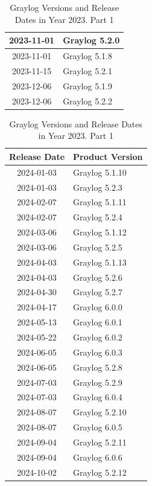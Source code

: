 \documentclass[../main.tex]{subfiles}
\begin{document}
\begin{table}[h]
\begin{minipage}{0.45\textwidth}
\begin{tabular}{|c|l|}
    2023-11-01 & Graylog 5.2.0 \\ \hline  
    2023-11-01 & Graylog 5.1.8 \\ \hline  
    2023-11-15 & Graylog 5.2.1 \\ \hline  
    2023-12-06 & Graylog 5.1.9 \\ \hline  
    2023-12-06 & Graylog 5.2.2 \\ \hline  
\end{tabular}
\caption{Graylog Versions and Release Dates in Year 2023. Part 1}
\end{minipage}
\hspace{1cm} %
\begin{minipage}{0.45\textwidth}
\centering
\begin{tabular}{|c|l|}
\hline
\textbf{Release Date} & \textbf{Product Version} \\ \hline
    2024-01-03 & Graylog 5.1.10 \\ \hline  
    2024-01-03 & Graylog 5.2.3 \\ \hline  
    2024-02-07 & Graylog 5.1.11 \\ \hline  
    2024-02-07 & Graylog 5.2.4 \\ \hline  
    2024-03-06 & Graylog 5.1.12 \\ \hline  
    2024-03-06 & Graylog 5.2.5 \\ \hline  
    2024-04-03 & Graylog 5.1.13 \\ \hline  
    2024-04-03 & Graylog 5.2.6 \\ \hline  
    2024-04-30 & Graylog 5.2.7 \\ \hline  
    2024-04-17 & Graylog 6.0.0 \\ \hline  
    2024-05-13 & Graylog 6.0.1 \\ \hline  
    2024-05-22 & Graylog 6.0.2 \\ \hline  
    2024-06-05 & Graylog 6.0.3 \\ \hline  
    2024-06-05 & Graylog 5.2.8 \\ \hline  
    2024-07-03 & Graylog 5.2.9 \\ \hline  
    2024-07-03 & Graylog 6.0.4 \\ \hline  
    2024-08-07 & Graylog 5.2.10 \\ \hline  
    2024-08-07 & Graylog 6.0.5 \\ \hline  
    2024-09-04 & Graylog 5.2.11 \\ \hline  
    2024-09-04 & Graylog 6.0.6 \\ \hline  
    2024-10-02 & Graylog 5.2.12 \\ \hline  

\end{tabular}
\end{minipage}
\end{table}
\end{document}
